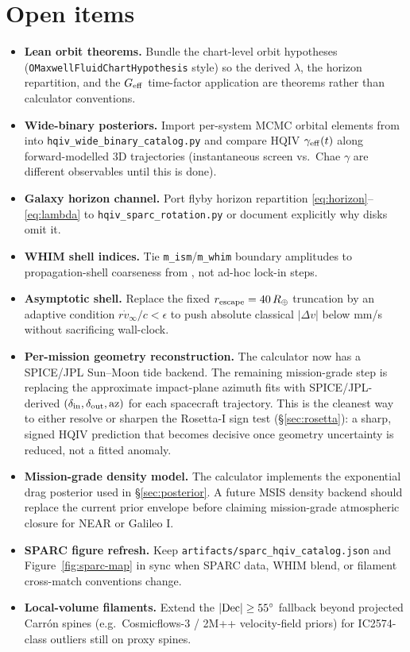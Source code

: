 \documentclass[11pt]{amsart}
\begin{document}
\section{Open items}\label{sec:open}

\begin{itemize}
\item \textbf{Lean orbit theorems.} Bundle the chart-level orbit hypotheses
(\texttt{OMaxwellFluidChartHypothesis} style) so the derived $\lambda$, the horizon
repartition, and the $G_{\rm eff}$ time-factor application are theorems rather than
calculator conventions.
\item \textbf{Wide-binary posteriors.} Import per-system MCMC orbital elements from
\cite{chae2026wide,saad2026wide} into \texttt{hqiv\_wide\_binary\_catalog.py} and
compare HQIV $\gamma_{\rm eff}(t)$ along forward-modelled 3D trajectories (instantaneous
screen vs.\ Chae $\gamma$ are different observables until this is done).
\item \textbf{Galaxy horizon channel.} Port flyby horizon repartition
\eqref{eq:horizon}--\eqref{eq:lambda} to \texttt{hqiv\_sparc\_rotation.py} or document
explicitly why disks omit it.
\item \textbf{WHIM shell indices.} Tie \texttt{m\_ism}/\texttt{m\_whim} boundary amplitudes
to propagation-shell coarseness from \cite{hqiv-kirchhoff-paper}, not ad-hoc lock-in steps.
\item \textbf{Asymptotic shell.} Replace the fixed $r_{\rm escape}=40\,R_\oplus$ truncation
by an adaptive condition $r\dot v_\infty/c<\epsilon$ to push absolute classical
$|\Delta v|$ below mm/s without sacrificing wall-clock.
\item \textbf{Per-mission geometry reconstruction.} The calculator now has a SPICE/JPL
Sun--Moon tide backend. The remaining mission-grade step is replacing the approximate
impact-plane azimuth fits with SPICE/JPL-derived
$(\delta_{\rm in},\delta_{\rm out},\text{az})$ for each spacecraft trajectory. This is the
cleanest way to either resolve or sharpen the Rosetta-I sign test
(\S\ref{sec:rosetta}): a sharp, signed HQIV prediction that becomes decisive once geometry
uncertainty is reduced, not a fitted anomaly.
\item \textbf{Mission-grade density model.} The calculator implements the exponential drag
posterior used in \S\ref{sec:posterior}. A future MSIS density backend should replace the
current prior envelope before claiming mission-grade atmospheric closure for NEAR or
Galileo I.
\item \textbf{SPARC figure refresh.} Keep \texttt{artifacts/sparc\_hqiv\_catalog.json} and
Figure~\ref{fig:sparc-map} in sync when SPARC data, WHIM blend, or filament cross-match
conventions change.
\item \textbf{Local-volume filaments.} Extend the $|{\rm Dec}|\ge 55^\circ$ fallback beyond
projected Carrón spines (e.g.\ Cosmicflows-3 / 2M++ velocity-field priors) for IC2574-class
outliers still on proxy spines.
\end{itemize}
\end{document}
